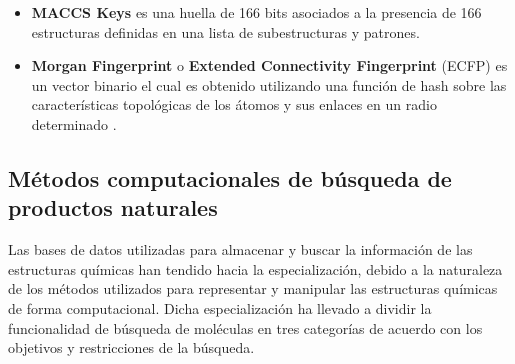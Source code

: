 \begin{itemize}
    \begin{itemize}
        \item \textbf{MACCS Keys} es una huella de 166 bits asociados a la presencia de 166 estructuras definidas en una lista de subestructuras y patrones.
        \item \textbf{Morgan Fingerprint} o \textbf{Extended Connectivity Fingerprint} (ECFP) es un vector binario el cual es obtenido utilizando una función de hash sobre las características topológicas de los átomos y sus enlaces en un radio determinado \cite{rogers2010extended}.
    \end{itemize}
\end{itemize}



\subsection{Métodos computacionales de búsqueda de productos naturales}


Las bases de datos utilizadas para almacenar y buscar la información de las estructuras químicas han tendido hacia la especialización, debido a la naturaleza de los métodos utilizados para representar y manipular las estructuras químicas de forma computacional. Dicha especialización ha llevado a dividir la funcionalidad de búsqueda de moléculas en tres categorías de acuerdo con los objetivos y restricciones de la búsqueda.


